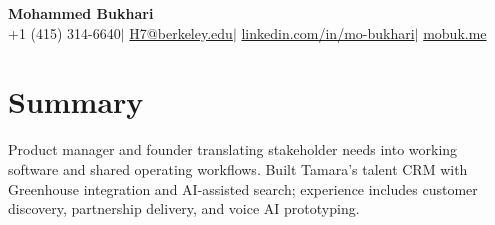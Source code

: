 \documentclass[a4paper,10pt]{article}
\begin{document}
\begin{center}
  {\LARGE\bfseries Mohammed Bukhari}\\[3pt]
  +1 (415) 314-6640\enspace$|$\enspace
  \href{mailto:H7@berkeley.edu}{H7@berkeley.edu}\enspace$|$\enspace
  \href{https://www.linkedin.com/in/mo-bukhari/}{linkedin.com/in/mo-bukhari}\enspace$|$\enspace
  \href{https://mobuk.me}{mobuk.me}
\end{center}
\vspace{-5pt}

\section{Summary}
Product manager and founder translating stakeholder needs into working software and shared operating workflows. Built Tamara's talent CRM with Greenhouse integration and AI-assisted search; experience includes customer discovery, partnership delivery, and voice AI prototyping.
\end{document}
